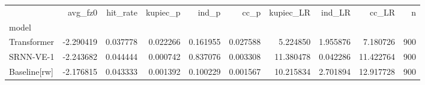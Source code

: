 \begin{tabular}{lrrrrrrrrr}
\toprule
 & avg_fz0 & hit_rate & kupiec_p & ind_p & cc_p & kupiec_LR & ind_LR & cc_LR & n \\
model &  &  &  &  &  &  &  &  &  \\
\midrule
Transformer & -2.290419 & 0.037778 & 0.022266 & 0.161955 & 0.027588 & 5.224850 & 1.955876 & 7.180726 & 900 \\
SRNN-VE-1 & -2.243682 & 0.044444 & 0.000742 & 0.837076 & 0.003308 & 11.380478 & 0.042286 & 11.422764 & 900 \\
Baseline[rw] & -2.176815 & 0.043333 & 0.001392 & 0.100229 & 0.001567 & 10.215834 & 2.701894 & 12.917728 & 900 \\
\bottomrule
\end{tabular}
